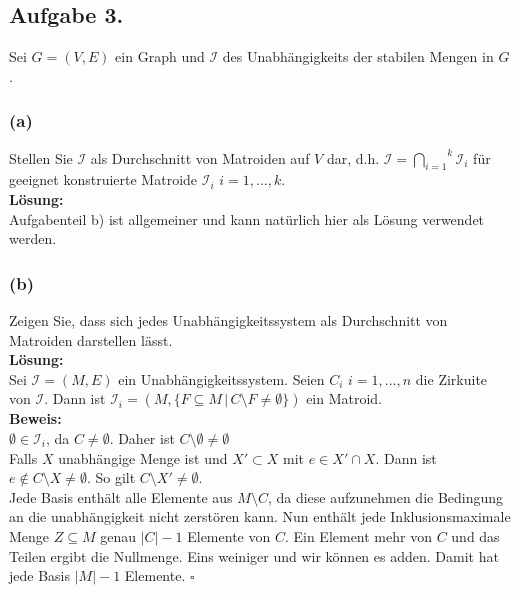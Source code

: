 \documentclass[11pt,a4paper,ngerman]{article}
\begin{document}
\subsection*{Aufgabe 3.}

Sei $G = (V,E)$ ein Graph und $\mathcal{I}$ des Unabhängigkeits der stabilen Mengen in $G$.

\subsubsection*{(a)}
Stellen Sie $\mathcal{I}$ als Durchschnitt von Matroiden auf $V$ dar, d.h. 
$\mathcal{I} = \overset{k}{\underset{i=1}{\bigcap}} \mathcal{I}_i$ für
geeignet konstruierte Matroide $\mathcal{I}_i$ $i = 1, ..., k$.\\

\textbf{Lösung:}\\

Aufgabenteil b) ist allgemeiner und kann natürlich hier als Lösung verwendet werden.


\subsubsection*{(b)}
Zeigen Sie, dass sich jedes Unabhängigkeitssystem als Durchschnitt von Matroiden
darstellen lässt.\\

\textbf{Lösung:}\\

Sei $\mathcal{I} = (M,E)$ ein Unabhängigkeitssystem.
Seien $C_i$ $i=1,...,n$ die Zirkuite von $\mathcal{I}$.
Dann ist 
$\mathcal{I}_i = (M, \{F \subseteq M \, | \, C \setminus F \not= \emptyset \})$
ein Matroid.\\
\textbf{Beweis:}\\
$\emptyset \in \mathcal{I}_i$, da $C \not = \emptyset$. Daher ist $C \setminus \emptyset \not= \emptyset$\\
Falls $X$ unabhängige Menge ist und $X' \subset X$ mit $e \in X' \cap X$.
Dann ist $e \not\in C \setminus X \not= \emptyset$. So gilt $C \setminus X' \not= \emptyset$.\\

Jede Basis enthält alle Elemente
aus $M \setminus C$, da diese aufzunehmen die Bedingung an die unabhängigkeit
nicht zerstören kann. Nun enthält jede Inklusionsmaximale Menge $Z \subseteq M$
genau $|C| - 1$ Elemente von $C$. Ein Element mehr von $C$ und das Teilen
ergibt die Nullmenge. Eins weiniger und wir können es adden. Damit
hat jede Basis $|M| - 1$ Elemente. 
\mbox{}\hfill$\square$
\end{document}
